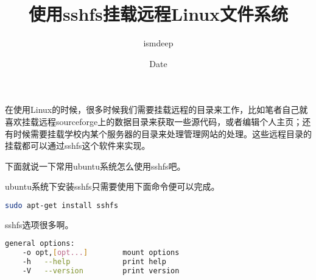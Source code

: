 \documentclass[12pt,a4paper,landscape]{article}
\begin{document}
\begin{CJK}{UTF8}{gbsn}
\title{使用sshfs挂载远程Linux文件系统}
\author{ismdeep}
\date{Date}


\maketitle



在使用Linux的时候，很多时候我们需要挂载远程的目录来工作，比如笔者自己就喜欢挂载远程sourceforge上的数据目录来获取一些源代码，或者编辑个人主页；还有时候需要挂载学校内某个服务器的目录来处理管理网站的处理。这些远程目录的挂载都可以通过sshfs这个软件来实现。

下面就说一下常用ubuntu系统怎么使用sshfs吧。

ubuntu系统下安装sshfs只需要使用下面命令便可以完成。

\begin{lstlisting}[language=bash]
sudo apt-get install sshfs
\end{lstlisting}

sshfs选项很多啊。
\begin{lstlisting}[language=bash]
general options:
    -o opt,[opt...]        mount options
    -h   --help            print help
    -V   --version         print version


\end{lstlisting}
\end{CJK}
\end{document}
